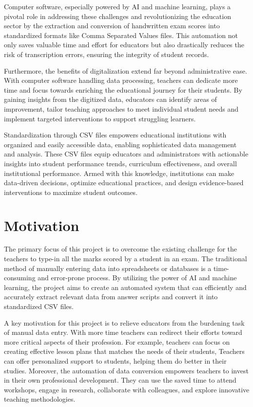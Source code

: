 \noindent Computer software, especially powered by AI and machine learning, plays a pivotal role in addressing these challenges and revolutionizing the education sector by the extraction and conversion of handwritten exam scores into standardized formats like Comma Separated Values files. This automation not only saves valuable time and effort for educators but also drastically reduces the risk of transcription errors, ensuring the integrity of student records.

\noindent Furthermore, the benefits of digitalization extend far beyond administrative ease. With computer software handling data processing, teachers can dedicate more time and  focus towards enriching the educational journey for their students. By gaining insights from the digitized data, educators can identify areas of improvement, tailor teaching approaches to meet individual student needs and implement targeted interventions to support struggling learners.

\noindent Standardization through CSV files empowers educational institutions with organized and easily accessible data, enabling sophisticated data management and analysis. These CSV files equip educators and administrators with actionable insights into student performance trends, curriculum effectiveness, and overall institutional performance. Armed with this knowledge, institutions can make data-driven decisions, optimize educational practices, and design evidence-based interventions to maximize student outcomes.

\clearpage

\section{Motivation}

\noindent The primary focus of this project is to overcome the existing challenge for the teachers to type-in all the marks scored by a student in an exam. The traditional method of manually entering data into spreadsheets or databases is a time-consuming and error-prone process. By utilizing the power of AI and machine learning, the project aims to create an automated system that can efficiently and accurately extract relevant data from answer scripts and convert it into standardized CSV files.


\noindent A key motivation for this project is to relieve educators from the burdening task of manual data entry. With more time teachers can redirect their efforts toward more critical aspects of their profession. For example, teachers can focus on creating effective lesson plans that matches the needs of their students, Teachers can offer personalized support to students, helping them do better in their studies. Moreover, the automation of data conversion empowers teachers to invest in their own professional development. They can use the saved time to attend workshops, engage in research, collaborate with colleagues, and explore innovative teaching methodologies.

